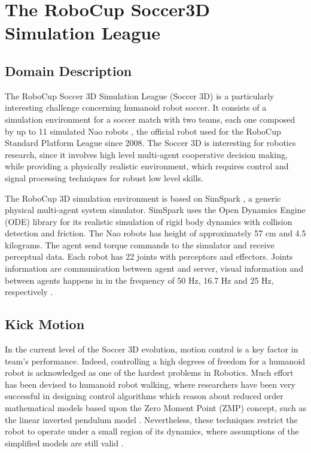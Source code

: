 \section{The RoboCup Soccer3D Simulation League}
\subsection{Domain Description}
The RoboCup Soccer 3D Simulation League (Soccer 3D) is a particularly interesting challenge concerning humanoid robot soccer. It consists of a simulation environment for a soccer match with two teams, each one composed by up to 11 simulated Nao robots \cite{gouaillier2009}, the official robot used for the RoboCup Standard Platform League since 2008. The Soccer 3D is interesting for robotics research, since it involves high level multi-agent cooperative decision making, while providing a physically realistic environment, which requires control and signal processing techniques for robust low level skills.

The RoboCup 3D simulation environment is based on SimSpark \cite{simspark} , a generic
physical multi-agent system simulator. SimSpark uses the Open Dynamics Engine (ODE) library for its realistic simulation of rigid body dynamics with
collision detection and friction. The Nao robots has height of approximately 57 cm and 4.5 kilograms. The agent send torque commands to the simulator and receive perceptual data. Each robot has 22 joints with perceptors and effectors. Joints information are communication between agent and server, visual information and between agents happens in in the frequency of 50 Hz, 16.7 Hz and 25 Hz, respectively \cite{AAAI12-MacAlpine}. 

\subsection{ Kick Motion }
In the current level of the Soccer 3D evolution, motion control is a key factor in team's performance. Indeed, controlling a high degrees of freedom for a humanoid robot is acknowledged as one of the hardest problems in Robotics. Much effort has been devised to humanoid robot walking, where researchers have been very successful in designing control algorithms which reason about reduced order mathematical models based upon the Zero Moment Point (ZMP) concept, such as the linear inverted pendulum model \cite{kajita2001}. Nevertheless, these techniques restrict the robot to operate under a small region of its dynamics, where assumptions of the simplified models are still valid \cite{collins2005,muniz2016}.

